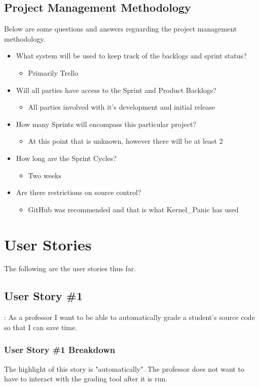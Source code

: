 \subsection{Project  Management Methodology}
 Below are some questions and answers reguarding the project management methodology.
\begin{itemize}
\item What system will be used to keep track of the backlogs and sprint status?
\begin{itemize}
\item Primarily Trello
\end{itemize}
\item Will all parties have access to the Sprint and Product Backlogs?
\begin{itemize}
\item All parties involved with it's development and initial release
\end{itemize}
\item How many Sprints will encompass this particular project?
\begin{itemize}
\item At this point that is unknown, however there will be at least 2
\end{itemize}
\item How long are the Sprint Cycles?
\begin{itemize}
\item Two weeks
\end{itemize}
\item Are there restrictions on source control? 
\begin{itemize}
\item GitHub was recommended and that is what Kernel\_Panic has used
\end{itemize}
\end{itemize}

\section{User Stories}
The following are the user stories thus far.



\subsection{User Story \#1}:
As a professor I want to be able to automatically grade a student's source code so that I can save time.

\subsubsection{User Story \#1 Breakdown} 
The highlight of this story is "automatically". The professor does not want to have to interact with the grading tool after it is run.
